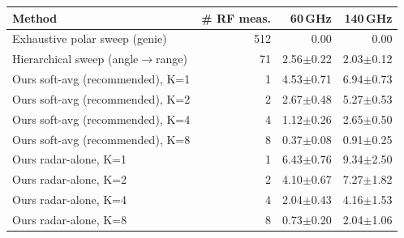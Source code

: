 \begin{tabular}{lrrr}
\toprule
Method & \# RF meas. & 60\,GHz & 140\,GHz \\
\midrule
Exhaustive polar sweep (genie) & 512 & 0.00 & 0.00 \\
Hierarchical sweep (angle$\to$range) & 71 & 2.56$\pm$0.22 & 2.03$\pm$0.12 \\
Ours soft-avg (recommended), K=1 & 1 & 4.53$\pm$0.71 & 6.94$\pm$0.73 \\
Ours soft-avg (recommended), K=2 & 2 & 2.67$\pm$0.48 & 5.27$\pm$0.53 \\
Ours soft-avg (recommended), K=4 & 4 & 1.12$\pm$0.26 & 2.65$\pm$0.50 \\
Ours soft-avg (recommended), K=8 & 8 & 0.37$\pm$0.08 & 0.91$\pm$0.25 \\
Ours radar-alone, K=1 & 1 & 6.43$\pm$0.76 & 9.34$\pm$2.50 \\
Ours radar-alone, K=2 & 2 & 4.10$\pm$0.67 & 7.27$\pm$1.82 \\
Ours radar-alone, K=4 & 4 & 2.04$\pm$0.43 & 4.16$\pm$1.53 \\
Ours radar-alone, K=8 & 8 & 0.73$\pm$0.20 & 2.04$\pm$1.06 \\
\bottomrule
\end{tabular}
